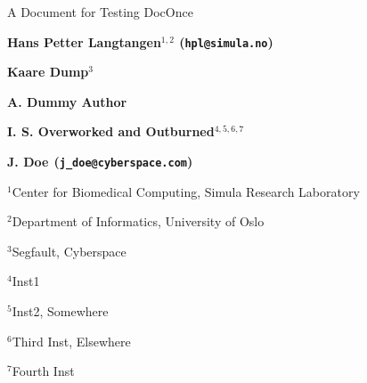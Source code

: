 \n\documentclass[%
oneside,                 %
final,                   %
10pt]{article}
\theoremstyle{definition}
\begin{document}

\newcommand{\exercisesection}[1]{\subsection*{#1}}








\thispagestyle{empty}

\begin{center}
{\LARGE\bf
\begin{spacing}{1.25}
A Document for Testing DocOnce
\end{spacing}
}
\end{center}


\begin{center}
{\bf Hans Petter Langtangen${}^{1, 2}$ (\texttt{hpl@simula.no})} \\ [0mm]
\end{center}


\begin{center}
{\bf Kaare Dump${}^{3}$} \\ [0mm]
\end{center}


\begin{center}
{\bf A. Dummy Author${}^{}$} \\ [0mm]
\end{center}


\begin{center}
{\bf I. S. Overworked and Outburned${}^{4, 5, 6, 7}$} \\ [0mm]
\end{center}


\begin{center}
{\bf J. Doe${}^{}$ (\texttt{j\_doe@cyberspace.com})} \\ [0mm]
\end{center}

\begin{center}
\centerline{{\small ${}^1$Center for Biomedical Computing, Simula Research Laboratory}}
\centerline{{\small ${}^2$Department of Informatics, University of Oslo}}
\centerline{{\small ${}^3$Segfault, Cyberspace}}
\centerline{{\small ${}^4$Inst1}}
\centerline{{\small ${}^5$Inst2, Somewhere}}
\centerline{{\small ${}^6$Third Inst, Elsewhere}}
\centerline{{\small ${}^7$Fourth Inst}}
\end{center}
    
\end{document}
